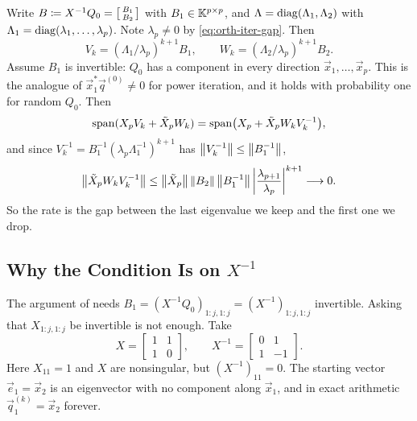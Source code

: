 Write $B \coloneqq X^{-1}Q_0 = \left[\begin{smallmatrix} B_1 \\ B_2 \end{smallmatrix}\right]$ with $B_1 \in \mathbb{K}^{p \times p}$, and $\Lambda = \operatorname{diag}(\Lambda_1, \Lambda_2)$ with $\Lambda_1 = \operatorname{diag}(\lambda_1, \dots, \lambda_p)$. Note $\lambda_p \ne 0$ by \cref{eq:orth-iter-gap}. Then
\begin{equation}
  V_k = (\Lambda_1/\lambda_p)^{k+1}B_1, \qquad W_k = (\Lambda_2/\lambda_p)^{k+1}B_2.
\end{equation}
Assume $B_1$ is invertible: $Q_0$ has a component in every direction $\vec{x}_1, \dots, \vec{x}_p$. This is the analogue of $\vec{x}_1^\ast\vec{q}^{(0)} \ne 0$ for power iteration, and it holds with probability one for random $Q_0$. Then
\begin{equation}
  \operatorname{span}(X_pV_k + \tilde{X}_pW_k) = \operatorname{span}\bigl(X_p + \tilde{X}_pW_kV_k^{-1}\bigr),
\end{equation}
and since $V_k^{-1} = B_1^{-1}(\lambda_p\Lambda_1^{-1})^{k+1}$ has $\left\lVert V_k^{-1} \right\rVert \le \left\lVert B_1^{-1} \right\rVert$,
\begin{equation}
  \left\lVert \tilde{X}_pW_kV_k^{-1} \right\rVert \le \left\lVert \tilde{X}_p \right\rVert\left\lVert B_2 \right\rVert\left\lVert B_1^{-1} \right\rVert\left\lvert \frac{\lambda_{p+1}}{\lambda_p} \right\rvert^{k+1} \longrightarrow 0.
\end{equation}
So the rate is the gap between the last eigenvalue we keep and the first one we drop.

\subsection{Why the Condition Is on $X^{-1}$}
\label{sec:xinv-condition}

The argument of  needs $B_1 = (X^{-1}Q_0)_{1:j,1:j} = (X^{-1})_{1:j,1:j}$ invertible. Asking that $X_{1:j,1:j}$ be invertible is not enough. Take
\begin{equation}
  X = \begin{bmatrix} 1 & 1 \\ 1 & 0 \end{bmatrix}, \qquad X^{-1} = \begin{bmatrix} 0 & 1 \\ 1 & -1 \end{bmatrix}.
\end{equation}
Here $X_{11} = 1$ and $X$ are nonsingular, but $(X^{-1})_{11} = 0$. The starting vector $\vec{e}_1 = \vec{x}_2$ is an eigenvector with no component along $\vec{x}_1$, and in exact arithmetic $\vec{q}_1^{(k)} = \vec{x}_2$ forever.

